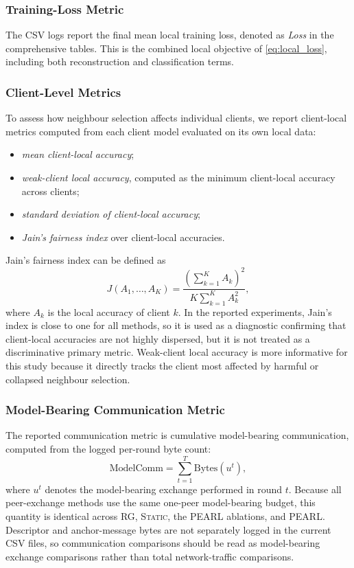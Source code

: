 \documentclass[conference]{IEEEtran}
\begin{document}
\subsubsection{Training-Loss Metric}
\label{subsubsec:training-loss-metric}
The CSV logs report the final mean local training loss, denoted as \emph{Loss} in the comprehensive tables. This is the combined local objective of \eqref{eq:local_loss}, including both reconstruction and classification terms.

\subsubsection{Client-Level Metrics}
\label{subsubsec:client-level-metrics}
To assess how neighbour selection affects individual clients, we report client-local metrics computed from each client model evaluated on its own local data:
\begin{itemize}
    \item \emph{mean client-local accuracy};
    \item \emph{weak-client local accuracy}, computed as the minimum client-local accuracy across clients;
    \item \emph{standard deviation of client-local accuracy};
    \item \emph{Jain's fairness index} over client-local accuracies.
\end{itemize}
Jain's fairness index can be defined as
\begin{equation*}
    J(A_1,\dots,A_K)
    =
    \frac{(\sum_{k=1}^{K}A_k)^2}{K\sum_{k=1}^{K}A_k^2},
\end{equation*}
where \(A_k\) is the local accuracy of client \(k\). In the reported experiments, Jain's index is close to one for all methods, so it is used as a diagnostic confirming that client-local accuracies are not highly dispersed, but it is not treated as a discriminative primary metric. Weak-client local accuracy is more informative for this study because it directly tracks the client most affected by harmful or collapsed neighbour selection.

\subsubsection{Model-Bearing Communication Metric}
\label{subsubsec:model-bearing-communication-metric}
The reported communication metric is cumulative model-bearing communication, computed from the logged per-round byte count:
\begin{equation*}
    \text{ModelComm}
    =
    \sum_{t=1}^{T}
    \text{Bytes}(u^t),
\end{equation*}
where \(u^t\) denotes the model-bearing exchange performed in round \(t\). Because all peer-exchange methods use the same one-peer model-bearing budget, this quantity is identical across \textsc{RG}, \textsc{Static}, the PEARL ablations, and \textsc{PEARL}. Descriptor and anchor-message bytes are not separately logged in the current CSV files, so communication comparisons should be read as model-bearing exchange comparisons rather than total network-traffic comparisons.
\end{document}
